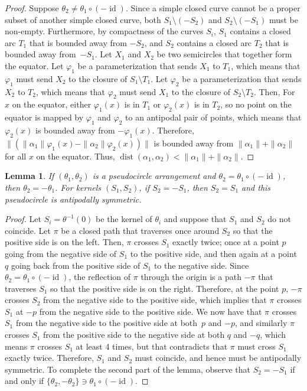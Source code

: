 \documentclass[11pt]{article}
\numberwithin{equation}{section}
\newtheorem{lemma}[theorem]{Lemma}
\theoremstyle{remark}
\let\phi\varphi
\DeclareMathOperator{\dist}{dist}
\DeclareMathOperator{\id}{id}
\begin{document}
\begin{proof}
Suppose $\theta_2 \neq \theta_1\circ(-\id)$.
Since a simple closed curve cannot be a proper subset of another simple closed curve, both $S_1 \setminus (-S_2)$ and $S_2 \setminus (-S_1)$ must be non-empty.
Furthermore, by compactness of the curves $S_i$, $S_1$ contains a closed arc $T_1$ that is bounded away from $-S_2$, and $S_2$ contains a closed arc $T_2$ that is bounded away from~$-S_1$. Let $X_1$ and $X_2$ be two semicircles that together form the equator. Let $\phi_1$ be a parameterization that sends $X_1$ to $T_1$, which means that $\phi_1$ must send $X_2$ to the closure of $S_1\setminus T_1$. Let $\phi_2$ be a parameterization that sends $X_2$ to $T_2$, which means that $\phi_2$ must send $X_1$ to the closure of $S_2\setminus T_2$.
Then,
For $x$ on the equator, either $\phi_1(x)$ is in $T_1$ or $\phi_2(x)$ is in $T_2$, so
no point on the equator is mapped by $\phi_1$ and $\phi_2$ to an antipodal pair of points,
which means that $\phi_2(x)$ is bounded away from $-\phi_1(x)$.
Therefore, $\|(\|\alpha_1\|\phi_1(x) - \|\alpha_2\|\phi_2(x))\|$ is bounded away from $\|\alpha_1\| + \|\alpha_2\|$ for all $x$ on the equator. Thus, $\dist(\alpha_1,\alpha_2) < \|\alpha_1\|+\|\alpha_2\|$.
\end{proof}

\begin{lemma}\label{lemma-reflections}
If $(\theta_1,\theta_2)$ is a pseudocircle arrangement and $\theta_2 = \theta_1 \circ (-\id)$,
then $\theta_2 = -\theta_1$. For kernels $(S_1,S_2)$, if $S_2 = -S_1$, then $S_2 = S_1$ and this pseudocircle is antipodally symmetric.
\end{lemma}

\begin{proof}
Let $S_i = \theta^{-1}(0)$ be the kernel of $\theta_i$ and suppose that $S_1$ and $S_2$ do not coincide.
Let $\pi$ be a closed path that traverses once around $S_2$ so that the positive side is on the left.
Then, $\pi$ crosses $S_1$ exactly twice; once at a point $p$ going from the negative side of $S_1$ to the positive side, and then again at a point $q$ going back from the positive side of $S_1$ to the negative side.
Since $\theta_2 = \theta_1 \circ (-\id)$, the reflection of $\pi$ through the origin is a path $-\pi$ that traverses $S_1$ so that the positive side is on the right.
Therefore, at the point $p$, $-\pi$ crosses $S_2$ from the negative side to the positive side, which implies that $\pi$ crosses $S_1$ at $-p$ from the negative side to the positive side.
We now have that $\pi$ crosses $S_1$ from the negative side to the positive side at both~$p$ and $-p$, and similarly $\pi$ crosses $S_1$ from the positive side to the negative side at both $q$ and $-q$, which means $\pi$ crosses $S_1$ at least 4 times, but that contradicts that $\pi$ must cross $S_1$ exactly twice.
Therefore, $S_1$ and $S_2$ must coincide, and hence must be antipodally symmetric.
To complete the second part of the lemma, observe that $S_2 = -S_1$ if and only if $\{\theta_2,-\theta_2\} \ni \theta_1 \circ (-\id)$.
\end{proof}
\end{document}
